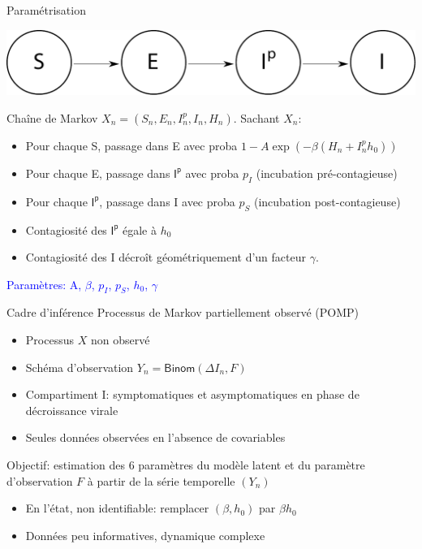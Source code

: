 \documentclass[dvipsnames,professionalfont,french]{beamer}
\begin{document}
\begin{frame}{Paramétrisation}
\begin{center}
\includegraphics[width=.8\textwidth]{Images/SEIIR.pdf}
\end{center}
Chaîne de Markov \(X_n=(S_n,E_n,I^p_n,I_n,H_n)\). Sachant \(X_n\):
\begin{itemize}
\item Pour chaque S, passage dans E avec proba \(1-A\exp(-\beta (H_n+
I_n^ph_0))\)
\item Pour chaque E, passage dans \(\mathsf{I}^\mathsf{p}\) avec proba \(p_I\) 
(incubation pré-contagieuse)
\item Pour chaque \(\mathsf{I}^\mathsf{p}\), passage dans I avec proba \(p_S\) 
(incubation post-contagieuse)
\item Contagiosité des \(\mathsf{I}^\mathsf{p}\) égale à \(h_0\)
\item Contagiosité des I décroît géométriquement d'un facteur \(\gamma\).
\end{itemize}
\textcolor{blue}{Paramètres: A, $\beta$, $p_I$, $p_S$, $h_0$, $\gamma$}
\end{frame}

\begin{frame}{Cadre d'inférence}
Processus de Markov partiellement observé (POMP)
\begin{itemize}
\item Processus \(X\) non observé
\item Schéma d'observation \(Y_n=\mathsf{Binom}(\Delta I_n,F)\)
\item Compartiment I: symptomatiques et asymptomatiques en phase de décroissance
virale
\item Seules données observées en l'absence de covariables
\end{itemize}
Objectif: estimation des 6 paramètres du modèle latent et du paramètre
d'observation \(F\) à partir de la série temporelle \((Y_n)\)
\begin{itemize}
\item En l'état, non identifiable: remplacer \((\beta,h_0)\) par \(\beta h_0\)
\item Données peu informatives, dynamique complexe
\end{itemize}
\end{frame}
\end{document}
